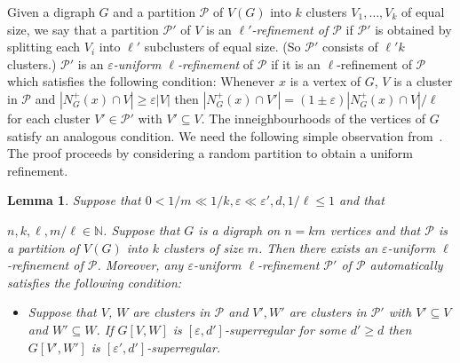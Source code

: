 \documentclass{memo-l}
\newtheorem{lemma}[firstthm]{Lemma}
\def\COMMENT#1{}
\def\cP{\mathcal{P}}
\def\eps{\varepsilon}
\numberwithin{section}{chapter}
\numberwithin{equation}{section}
\numberwithin{firstthm}{section}
\numberwithin{figure}{section}
\begin{document}
Given a digraph $G$ and a partition $\cP$ of $V(G)$ into $k$ clusters $V_1,\dots,V_k$ of equal size,
we say that a partition $\cP'$ of $V$ is an \emph{$\ell'$-refinement of $\cP$} if $\cP'$ is obtained by splitting each $V_i$
into $\ell'$ subclusters of equal size. (So $\cP'$ consists of $\ell'k$ clusters.)
$\cP'$ is an \emph{$\eps$-uniform $\ell$-refinement}
of $\cP$ if it is an $\ell$-refinement of $\cP$ which satisfies the following condition:
Whenever $x$ is a vertex of $G$, $V$ is a cluster in $\cP$ and $|N^+_G(x)\cap V|\ge \eps |V|$
then $|N^+_G(x)\cap V'|=(1\pm \eps)|N^+_G(x)\cap V|/\ell$ for each cluster $V'\in \cP'$ with $V'\subseteq V$.
The inneighbourhoods of the vertices of $G$ satisfy an analogous condition.
We need the following simple observation from~\cite{Kelly}. The proof proceeds by considering a random partition
to obtain a uniform refinement.
\begin{lemma} \label{randompartition}
Suppose that $0<1/m \ll 1/k,\eps \ll \eps', d,1/\ell \le 1$ and that%
     \COMMENT{Daniela: previously only had $m/\ell\in\mathbb{N}$}
$n,k,\ell,m/\ell\in\mathbb{N}$.
Suppose that $G$ is a digraph on $n=km$ vertices and that $\cP$ is a partition of $V(G)$ into
$k$ clusters of size $m$. Then there exists an $\eps$-uniform $\ell$-refinement of $\cP$. Moreover, any
$\eps$-uniform $\ell$-refinement $\cP'$ of $\cP$ automatically satisfies
the following condition:
\begin{itemize}
\item Suppose that $V$, $W$ are clusters in $\cP$ and $V',W'$ are clusters in $\cP'$ with $V'\subseteq V$ and
$W'\subseteq W$. If $G[V,W]$ is $[\eps,d']$-superregular for some $d'\ge d$ then $G[V',W']$ is $[\eps',d']$-superregular.
\end{itemize}
\end{lemma}
\end{document}
